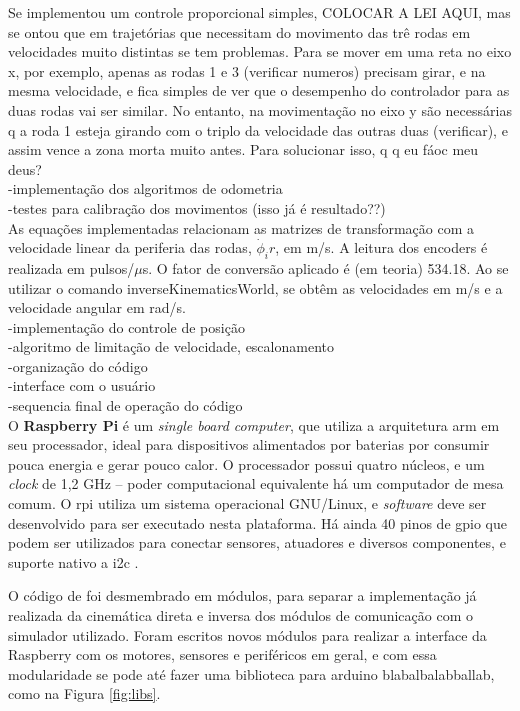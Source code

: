 Se implementou um controle proporcional simples, COLOCAR A LEI AQUI, mas se ontou que em trajetórias que necessitam do movimento das trê rodas em velocidades muito distintas se tem problemas. Para se mover em uma reta no eixo x, por exemplo, apenas as rodas 1 e 3 (verificar numeros) precisam girar, e na mesma velocidade, e fica simples de ver que o desempenho do controlador para as duas rodas vai ser similar. No entanto, na movimentação no eixo y são necessárias q a roda 1 esteja girando com o triplo da velocidade das outras duas (verificar), e assim vence a zona morta muito antes. Para solucionar isso, q q eu fáoc meu deus?\\
-implementação dos algoritmos de odometria \\
-testes para calibração dos movimentos (isso já é resultado??) \\

As equações implementadas relacionam as matrizes de transformação com a velocidade linear da periferia das rodas, $\dot{\phi}_i r$, em m/s. A leitura dos encoders é realizada em pulsos/$\mu$s. O fator de conversão aplicado é (em teoria) 534.18. Ao se utilizar o comando inverseKinematicsWorld, se obtêm as velocidades em m/s e a velocidade angular em rad/s. \\
-implementação do controle de posição \\
-algoritmo de limitação de velocidade, escalonamento \\
-organização do código \\
-interface com o usuário \\
-sequencia final de operação do código \\

O \textbf{Raspberry Pi} é um \emph{single board computer}, que utiliza a arquitetura \acrshort{arm} em seu processador, ideal para dispositivos alimentados por baterias por consumir pouca energia e gerar pouco calor. O processador possui quatro núcleos, e um \emph{clock} de 1,2 GHz -- poder computacional equivalente há um computador de mesa comum. O \acrshort{rpi} utiliza um sistema operacional GNU/Linux, e \emph{software} deve ser desenvolvido para ser executado nesta plataforma. Há ainda 40 pinos de \acrshort{gpio} que podem ser utilizados para conectar sensores, atuadores e diversos componentes, e suporte nativo a \acrshort{i2c} \citep{upton2014raspberry}.

O código de \citet{ritter2016modelagem} foi desmembrado em módulos, para separar a implementação já realizada da cinemática direta e inversa dos módulos de comunicação com o simulador utilizado. Foram escritos novos módulos para realizar a interface da Raspberry com os motores, sensores e periféricos em geral, e com essa modularidade se pode até fazer uma biblioteca para arduino blabalbalabballab, como na Figura \ref{fig:libs}.

